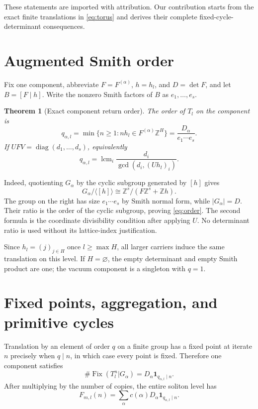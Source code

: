 \documentclass[10pt]{article}
\newtheorem{theorem}{Theorem}
\begin{document}
These statements are imported with attribution.  Our contribution starts
from the exact finite translations in \eqref{eq:torus} and derives their
complete fixed-cycle-determinant consequences.

\section{Augmented Smith order}
Fix one component, abbreviate $F=F^{(\alpha)}$, $h=h_l$, and
$D=\det F$, and let $B=[F\mid h]$.  Write the nonzero Smith factors of $B$
as $e_1,\ldots,e_s$.

\begin{theorem}[Exact component return order]\label{th:order}
The order of $T_l$ on the component is
\begin{equation}\label{eq:order}
q_{\alpha,l}=\min\{n\ge1:nh_l\in F^{(\alpha)}\mathbb Z^H\}
=\frac{D_\alpha}{e_1\cdots e_s}.
\end{equation}
If $UFV=\operatorname{diag}(d_1,\ldots,d_s)$, equivalently
\[
q_{\alpha,l}=\operatorname{lcm}_i
\frac{d_i}{\gcd(d_i,(Uh_l)_i)}.
\]
\end{theorem}

Indeed, quotienting $G_\alpha$ by the cyclic subgroup generated by $[h]$
gives
\[
G_\alpha/\langle[h]\rangle
\cong\mathbb Z^s/(F\mathbb Z^s+\mathbb Zh).
\]
The group on the right has size $e_1\cdots e_s$ by Smith normal form, while
$|G_\alpha|=D$.  Their ratio is the order of the cyclic subgroup, proving
\eqref{eq:order}.  The second formula is the coordinate divisibility
condition after applying $U$.  No determinant ratio is used without its
lattice-index justification.

Since $h_l=(j)_{j\in H}$ once $l\ge\max H$, all larger carriers induce the
same translation on this level.  If $H=\varnothing$, the empty determinant
and empty Smith product are one; the vacuum component is a singleton with
$q=1$.

\section{Fixed points, aggregation, and primitive cycles}
Translation by an element of order $q$ on a finite group has a fixed point
at iterate $n$ precisely when $q\mid n$, in which case every point is fixed.
Therefore one component satisfies
\begin{equation}\label{eq:component-fix}
\#\operatorname{Fix}(T_l^n|G_\alpha)
=D_\alpha\mathbf1_{q_{\alpha,l}\mid n}.
\end{equation}
After multiplying by the number of copies, the entire soliton level has
\begin{equation}\label{eq:level-fix}
F_{m,l}(n)=\sum_\alpha c(\alpha)D_\alpha
\mathbf1_{q_{\alpha,l}\mid n}.
\end{equation}
\end{document}
